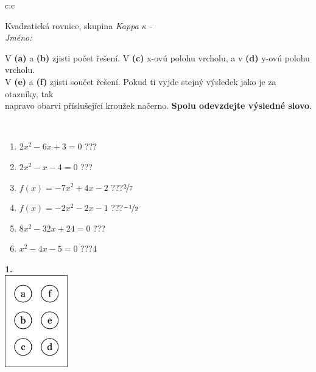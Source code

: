 \documentclass[10pt]{report}
\begin{document}
\begin{tabular}{c:c}
\begin{minipage}[c][104.5mm][t]{0.5\linewidth}
\begin{center}
\vspace{7mm}
{\huge Kvadratická rovnice, skupina \textit{Kappa $\kappa$} -}\\[5mm]
\textit{Jméno:}\phantom{xxxxxxxxxxxxxxxxxxxxxxxxxxxxxxxxxxxxxxxxxxxxxxxxxxxxxxxxxxxxxxxxx}\\[5mm]
\begin{minipage}{0.95\linewidth}
\begin{center}
V \textbf{(a)} a \textbf{(b)} zjisti počet řešení. V \textbf{(c)} x-ovú polohu vrcholu, a v \textbf{(d)} y-ovú polohu vrcholu.\\V \textbf{(e)} a \textbf{(f)} zjisti součet řešení. Pokud ti vyjde stejný výsledek jako je za otazníky, tak\\napravo obarvi příslušející kroužek načerno. \textbf{Spolu odevzdejte výsledné slovo}.
\end{center}
\end{minipage}
\\[1mm]
\begin{minipage}{0.79\linewidth}
\begin{center}
\begin{varwidth}{\linewidth}
\begin{enumerate}
\Large
\item $2x^2-6x+3=0$\quad \dotfill\; ???\;\dotfill {}
\item $2x^2-x-4=0$\quad \dotfill\; ???\;\dotfill {}
\item $f(x)=-7x^2+4x-2$\quad \dotfill\; ???\;\dotfill \quad $\nicefrac{2}{7}$
\item $f(x)=-2x^2-2x-1$\quad \dotfill\; ???\;\dotfill \quad $\nicefrac{-1}{2}$
\item $8x^2-32x+24=0$\quad \dotfill\; ???\;\dotfill {}
\item $x^2-4x-5=0$\quad \dotfill\; ???\;\dotfill \quad $4$
\end{enumerate}
\end{varwidth}
\end{center}
\end{minipage}
\begin{minipage}{0.20\linewidth}
\begin{center}
{\Huge\bfseries 1.} \\[2mm]
\includegraphics[height=40mm]{../images/braille.png}

\end{center}
\end{minipage}
\end{center}
\end{minipage}
\end{tabular}
\end{document}
